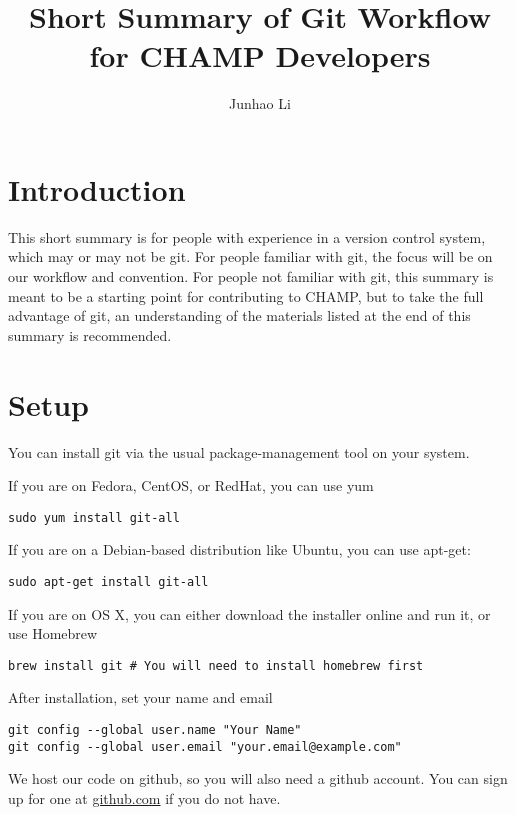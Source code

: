 \documentclass[runningheads,letterpaper]{llncs}
\begin{document}
\mainmatter
\title{Short Summary of Git Workflow for CHAMP Developers}

\author{Junhao Li}

\maketitle

\section*{Introduction}

This short summary is for people with experience in a version control system, which may or may not be git.
For people familiar with git, the focus will be on our workflow and convention.
For people not familiar with git, this summary is meant to be a starting point for contributing to CHAMP, but to take the full advantage of git, an understanding of the materials listed at the end of this summary is recommended.

\section{Setup}

You can install git via the usual package-management tool on your system.

If you are on Fedora, CentOS, or RedHat, you can use yum
\begin{verbatim}
sudo yum install git-all
\end{verbatim}
If you are on a Debian-based distribution like Ubuntu, you can use apt-get:
\begin{verbatim}
sudo apt-get install git-all
\end{verbatim}
If you are on OS X, you can either download the installer online and run it, or use Homebrew
\begin{verbatim}
brew install git # You will need to install homebrew first
\end{verbatim}

After installation, set your name and email
\begin{verbatim}
git config --global user.name "Your Name"
git config --global user.email "your.email@example.com"
\end{verbatim}

We host our code on github, so you will also need a github account.
You can sign up for one at \url{github.com} if you do not have.
\end{document}
